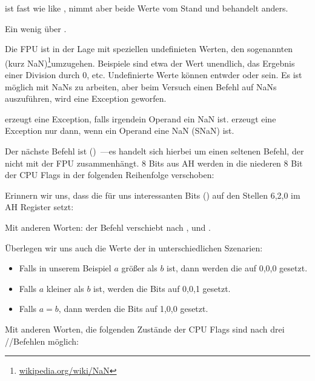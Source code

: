 


\FUCOMPP{} ist fast wie like \FCOM, nimmt aber beide Werte vom Stand und
behandelt  anders.


Ein wenig über .

\newcommand{\NANFN}{\footnote{\href{http://go.yurichev.com/17130}{wikipedia.org/wiki/NaN}}}
Die FPU ist in der Lage mit speziellen undefinieten Werten, den sogenannten
(kurz \gls{NaN})\NANFN umzugehen. Beispiele sind etwa der Wert
unendlich, das Ergebnis einer Division durch 0, etc. Undefinierte Werte können
entwder  oder  sein. Es ist möglich mit  NaNs zu
arbeiten, aber beim Versuch einen Befehl auf  NaNs auszuführen,
wird eine Exception geworfen. 

\FCOM erzeugt eine Exception, falls irgendein Operand ein \gls{NaN} ist.
\FUCOM erzeugt eine Exception nur dann, wenn ein Operand eine 
\gls{NaN} (SNaN) ist.

\label{SAHF}
Der nächste Befehl ist \SAHF ()~---es handelt sich
hierbei um einen seltenen Befehl, der nicht mit der FPU zusammenhängt.
8 Bits aus AH werden in die niederen 8 Bit der CPU Flags in der folgenden
Reihenfolge verschoben:



Erinnern wir uns, dass \FNSTSW die für uns interessanten Bits (\CThreeBits) auf
den Stellen 6,2,0 im AH Register setzt:


Mit anderen Worten: der Befehl  verschiebt \CThreeBits
nach \ZF, \PF und \CF. 

Überlegen wir uns auch die Werte der \CThreeBits in unterschiedlichen Szenarien:

\begin{itemize} 
  \item Falls in unserem Beispiel $a$ größer als $b$ ist, dann werden die
  \CThreeBits auf 0,0,0 gesetzt.
  \item Falls $a$ kleiner als $b$ ist, werden die Bits auf 0,0,1 gesetzt.
  \item Falls $a=b$, dann werden die Bits auf 1,0,0 gesetzt.
\end{itemize}
Mit anderen Worten, die folgenden Zustände der CPU Flags sind nach drei
\FUCMPP/\FNSTSW/\SAHF Befehlen möglich:

